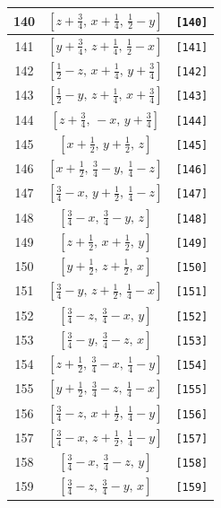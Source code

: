 \documentclass[fleqn,8pt]{jsarticle}
\begin{document}
\begin{longtable}{ccc}
140 & $\left[ z + \frac{3}{4},\, x + \frac{1}{4},\, \frac{1}{2} - y \right]$ & {\tt [140]} \\ \hline
141 & $\left[ y + \frac{3}{4},\, z + \frac{1}{4},\, \frac{1}{2} - x \right]$ & {\tt [141]} \\ \hline
142 & $\left[ \frac{1}{2} - z,\, x + \frac{1}{4},\, y + \frac{3}{4} \right]$ & {\tt [142]} \\ \hline
143 & $\left[ \frac{1}{2} - y,\, z + \frac{1}{4},\, x + \frac{3}{4} \right]$ & {\tt [143]} \\ \hline
144 & $\left[ z + \frac{3}{4},\, - x,\, y + \frac{3}{4} \right]$ & {\tt [144]} \\ \hline
145 & $\left[ x + \frac{1}{2},\, y + \frac{1}{2},\, z \right]$ & {\tt [145]} \\ \hline
146 & $\left[ x + \frac{1}{2},\, \frac{3}{4} - y,\, \frac{1}{4} - z \right]$ & {\tt [146]} \\ \hline
147 & $\left[ \frac{3}{4} - x,\, y + \frac{1}{2},\, \frac{1}{4} - z \right]$ & {\tt [147]} \\ \hline
148 & $\left[ \frac{3}{4} - x,\, \frac{3}{4} - y,\, z \right]$ & {\tt [148]} \\ \hline
149 & $\left[ z + \frac{1}{2},\, x + \frac{1}{2},\, y \right]$ & {\tt [149]} \\ \hline
150 & $\left[ y + \frac{1}{2},\, z + \frac{1}{2},\, x \right]$ & {\tt [150]} \\ \hline
151 & $\left[ \frac{3}{4} - y,\, z + \frac{1}{2},\, \frac{1}{4} - x \right]$ & {\tt [151]} \\ \hline
152 & $\left[ \frac{3}{4} - z,\, \frac{3}{4} - x,\, y \right]$ & {\tt [152]} \\ \hline
153 & $\left[ \frac{3}{4} - y,\, \frac{3}{4} - z,\, x \right]$ & {\tt [153]} \\ \hline
154 & $\left[ z + \frac{1}{2},\, \frac{3}{4} - x,\, \frac{1}{4} - y \right]$ & {\tt [154]} \\ \hline
155 & $\left[ y + \frac{1}{2},\, \frac{3}{4} - z,\, \frac{1}{4} - x \right]$ & {\tt [155]} \\ \hline
156 & $\left[ \frac{3}{4} - z,\, x + \frac{1}{2},\, \frac{1}{4} - y \right]$ & {\tt [156]} \\ \hline
157 & $\left[ \frac{3}{4} - x,\, z + \frac{1}{2},\, \frac{1}{4} - y \right]$ & {\tt [157]} \\ \hline
158 & $\left[ \frac{3}{4} - x,\, \frac{3}{4} - z,\, y \right]$ & {\tt [158]} \\ \hline
159 & $\left[ \frac{3}{4} - z,\, \frac{3}{4} - y,\, x \right]$ & {\tt [159]} \\ \hline

\end{longtable}
\end{document}
